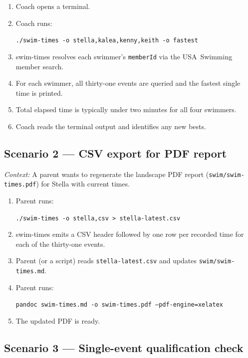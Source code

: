 \documentclass[12pt]{article}
\newcommand{\code}[1]{\texttt{#1}}
\begin{document}
\begin{enumerate}
  \item Coach opens a terminal.
  \item Coach runs:
        \begin{center}
          \code{./swim-times -o stella,kalea,kenny,keith -o fastest}
        \end{center}
  \item swim-times resolves each swimmer's \code{memberId} via the
        USA~Swimming member search.
  \item For each swimmer, all thirty-one events are queried and
        the fastest single time is printed.
  \item Total elapsed time is typically under two minutes for all
        four swimmers.
  \item Coach reads the terminal output and identifies any new bests.
\end{enumerate}

\subsection{Scenario 2 --- CSV export for PDF report}

\textit{Context:} A parent wants to regenerate the landscape PDF
report (\code{swim/swim-times.pdf}) for Stella with current times.

\begin{enumerate}
  \item Parent runs:
        \begin{center}
          \code{./swim-times -o stella,csv > stella-latest.csv}
        \end{center}
  \item swim-times emits a CSV header followed by one row per
        recorded time for each of the thirty-one events.
  \item Parent (or a script) reads \code{stella-latest.csv}
        and updates \code{swim/swim-times.md}.
  \item Parent runs:
        \begin{center}
          \code{pandoc swim-times.md -o swim-times.pdf
                --pdf-engine=xelatex}
        \end{center}
  \item The updated PDF is ready.
\end{enumerate}

\subsection{Scenario 3 --- Single-event qualification check}
\end{document}
